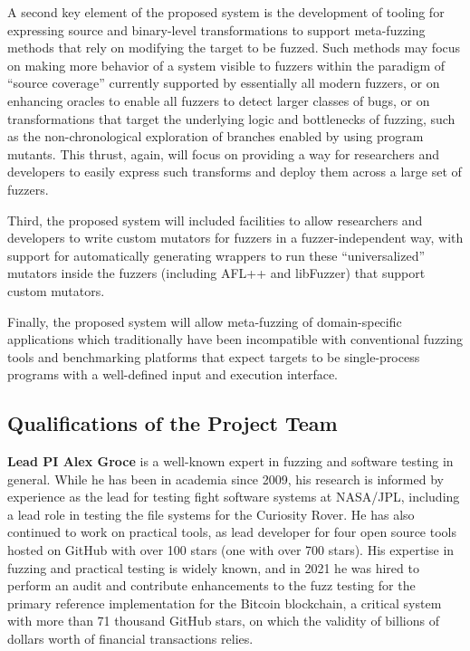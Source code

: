 A second key element of the proposed system is the development of tooling for 
expressing source and binary-level transformations to support meta-fuzzing 
methods that rely on modifying the target to be fuzzed.  Such methods may focus 
on making more behavior of a system visible to fuzzers within the paradigm of 
``source coverage'' currently supported by essentially all modern fuzzers, or 
on enhancing oracles to enable all fuzzers to detect larger classes of bugs, or 
on transformations that target the underlying logic and bottlenecks of fuzzing, 
such as the non-chronological exploration of branches enabled by using program 
mutants.  This thrust, again, will focus on providing a way for researchers and 
developers to easily express such transforms and deploy them across a large set 
of fuzzers.

Third, the proposed system will included facilities to allow researchers and developers to 
write custom mutators for fuzzers in a fuzzer-independent way, with support for 
automatically generating wrappers to run these ``universalized'' mutators 
inside the fuzzers (including AFL++ and libFuzzer) that 
support custom mutators.

Finally, the proposed system will allow meta-fuzzing of domain-specific applications
which traditionally have been incompatible with conventional fuzzing tools and
benchmarking platforms that expect targets to be single-process programs with
a well-defined input and execution interface.

\subsection{Qualifications of the Project Team}

{\bf Lead PI Alex Groce} is a well-known expert in fuzzing and software testing
in general. While he has been in academia since 2009, his research is informed
by experience as the lead for testing fight software systems at NASA/JPL,
including a lead role in testing the file systems for the Curiosity Rover. He
has also continued to work on practical tools, as lead developer for four open
source tools hosted on GitHub with over 100 stars (one with over 700
stars). His expertise in fuzzing and
practical testing is widely known, and in 2021 he was hired to perform an audit
and contribute enhancements to the fuzz testing for the primary reference
implementation for the Bitcoin blockchain, a critical system with more than 71
thousand GitHub stars, on which the validity of billions of dollars worth of
financial transactions relies.

